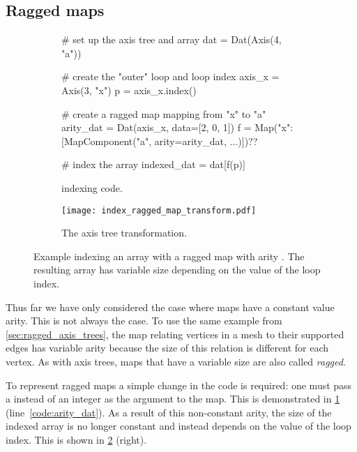 \documentclass[thesis]{subfiles}
\begin{document}
\subsection{Ragged maps}
\label{sec:indexing_ragged_maps}

\begin{figure}
  \centering

  \begin{subfigure}{.9\textwidth}
    \begin{pyalg2}
      # set up the axis tree and array
      dat = Dat(Axis(4, "a"))

      # create the "outer" loop and loop index
      axis_x = Axis(3, "x")
      p = axis_x.index()

      # create a ragged map mapping from "x" to "a"
      arity_dat = Dat(axis_x, data=[2, 0, 1])
      f = Map({"x": [MapComponent("a", arity=arity_dat, ...)]})?\label{code:arity_dat}?

      # index the array
      indexed_dat = dat[f(p)]
    \end{pyalg2}

    \caption{ indexing code.}
    \label{fig:index_ragged_map_code}
  \end{subfigure}

  \vspace{1em}

  \begin{subfigure}{\textwidth}
    \centering
    \texttt{[image: index\_ragged\_map\_transform.pdf]}
    \caption{The axis tree transformation.}
    \label{fig:index_ragged_map_transform}
  \end{subfigure}

  \caption{
    Example indexing an array with a ragged map with arity \pycode{[2, 0, 1]}.
    The resulting array has variable size depending on the value of the loop index.
  }
  \label{fig:index_ragged_map}
\end{figure}

Thus far we have only considered the case where maps have a constant value arity.
This is not always the case.
To use the same example from \cref{sec:ragged_axis_trees}, the map relating vertices in a mesh to their supported edges has variable arity because the size of this relation is different for each vertex.
As with axis trees, maps that have a variable size are also called \emph{ragged}.

To represent ragged maps a simple change in the code is required: one must pass a  instead of an integer as the  argument to the map.
This is demonstrated in \cref{fig:index_ragged_map_code} (line~\ref{code:arity_dat}).
As a result of this non-constant arity, the size of the indexed array is no longer constant and instead depends on the value of the loop index.
This is shown in \cref{fig:index_ragged_map_transform} (right).
\end{document}
